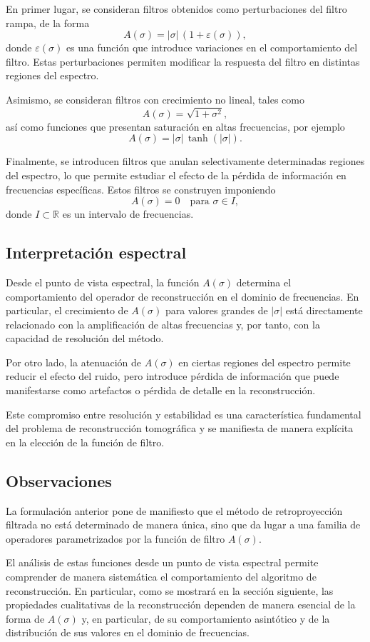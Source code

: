 En primer lugar, se consideran filtros obtenidos como perturbaciones del filtro rampa, de la forma
\[
A(\sigma) = |\sigma|\,(1 + \varepsilon(\sigma)),
\]
donde $\varepsilon(\sigma)$ es una función que introduce variaciones en el comportamiento del filtro. Estas perturbaciones permiten modificar la respuesta del filtro en distintas regiones del espectro.

Asimismo, se consideran filtros con crecimiento no lineal, tales como
\[
A(\sigma) = \sqrt{1 + \sigma^{2}},
\]
así como funciones que presentan saturación en altas frecuencias, por ejemplo
\[
A(\sigma) = |\sigma|\,\tanh(|\sigma|).
\]

Finalmente, se introducen filtros que anulan selectivamente determinadas regiones del espectro, lo que permite estudiar el efecto de la pérdida de información en frecuencias específicas. Estos filtros se construyen imponiendo
\[
A(\sigma) = 0 \quad \text{para } \sigma \in I,
\]
donde $I \subset \mathbb{R}$ es un intervalo de frecuencias.

\subsection*{Interpretación espectral}

Desde el punto de vista espectral, la función $A(\sigma)$ determina el comportamiento del operador de reconstrucción en el dominio de frecuencias. En particular, el crecimiento de $A(\sigma)$ para valores grandes de $|\sigma|$ está directamente relacionado con la amplificación de altas frecuencias y, por tanto, con la capacidad de resolución del método.

Por otro lado, la atenuación de $A(\sigma)$ en ciertas regiones del espectro permite reducir el efecto del ruido, pero introduce pérdida de información que puede manifestarse como artefactos o pérdida de detalle en la reconstrucción.

Este compromiso entre resolución y estabilidad es una característica fundamental del problema de reconstrucción tomográfica y se manifiesta de manera explícita en la elección de la función de filtro.

\subsection*{Observaciones}

La formulación anterior pone de manifiesto que el método de retroproyección filtrada no está determinado de manera única, sino que da lugar a una familia de operadores parametrizados por la función de filtro $A(\sigma)$.

El análisis de estas funciones desde un punto de vista espectral permite comprender de manera sistemática el comportamiento del algoritmo de reconstrucción. En particular, como se mostrará en la sección siguiente, las propiedades cualitativas de la reconstrucción dependen de manera esencial de la forma de $A(\sigma)$ y, en particular, de su comportamiento asintótico y de la distribución de sus valores en el dominio de frecuencias.